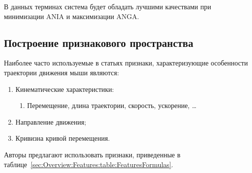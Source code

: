 \documentclass[12pt]{article}
\begin{document}
    \par В данных терминах система будет обладать лучшими качествами при минимизации ANIA и максимизации ANGA.


    \subsection{Построение признакового пространства}
    \label{sec:Overview:Features}

    \par Наиболее часто используемые в статьях признаки, характеризующие особенности траектории движения мыши являются:

    \begin{enumerate}
        \item Кинематические характеристики:
        \begin{enumerate}
            \item Перемещение, длина траектории, скорость, ускорение, \ldots
        \end{enumerate}
        \item Направление движения;
        \item Кривизна кривой перемещения.
    \end{enumerate}

    \par Авторы \cite{Mondal} предлагают использовать признаки, приведенные в таблице~\ref{sec:Overview:Features:table:FeaturesFormulas}.
    
\end{document}

